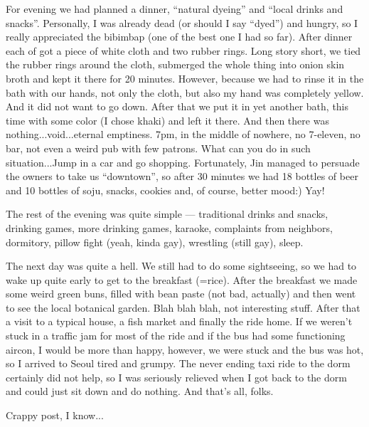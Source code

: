 \begin{post}
\begin{content}
For evening we had planned a dinner, ``natural dyeing'' and ``local drinks and snacks''. Personally, I was already dead (or should I say ``dyed'') and hungry, so I really appreciated the bibimbap (one of the best one I had so far). After dinner each of got a piece of white cloth and two rubber rings. Long story short, we tied the rubber rings around the cloth, submerged the whole thing into onion skin broth and kept it there for 20 minutes. However, because we had to rinse it in the bath with our hands, not only the cloth, but also my hand was completely yellow. And it did not want to go down. After that we put it in yet another bath, this time with some color (I chose khaki) and left it there. And then there was nothing...void...eternal emptiness. 7pm, in the middle of nowhere, no 7-eleven, no bar, not even a weird pub with few patrons. What can you do in such situation...Jump in a car and go shopping. Fortunately, Jin managed to persuade the owners to take us ``downtown'', so after 30 minutes we had 18 bottles of beer and 10 bottles of soju, snacks, cookies and, of course, better mood:) Yay!

The rest of the evening was quite simple — traditional drinks and snacks, drinking games, more drinking games, karaoke, complaints from neighbors, dormitory, pillow fight (yeah, kinda gay), wrestling (still gay), sleep.

The next day was quite a hell. We still had to do some sightseeing, so we had to wake up quite early to get to the breakfast (=rice). After the breakfast we made some weird green buns, filled with bean paste (not bad, actually) and then went to see the local botanical garden. Blah blah blah, not interesting stuff. After that a visit to a typical house, a fish market and finally the ride home. If we weren't stuck in a traffic jam for most of the ride and if the bus had some functioning aircon, I would be more than happy, however, we were stuck and the bus was hot, so I arrived to Seoul tired and grumpy. The never ending taxi ride to the dorm certainly did not help, so I was seriously relieved when I got back to the dorm and could just sit down and do nothing. And that's all, folks.

Crappy post, I know...
	\end{content}
\end{post}
